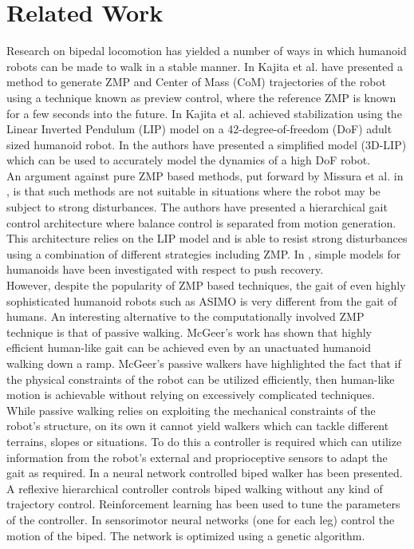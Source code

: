 \documentclass[12pt,twoside]{article}
\theoremstyle{plain}
\theoremstyle{definition}
\theoremstyle{remark}
\newcommand{\forceindent}{\leavevmode{\parindent=2em\indent}}
\begin{document}
\section{Related Work}
\label{sec:Related_Work}
Research on bipedal locomotion has yielded a number of  ways in which humanoid robots can be made to walk in a stable manner. In \cite{kajita2003biped} Kajita et al. have presented a method to generate ZMP and Center of Mass (CoM) trajectories of the robot using a technique known as preview control, where the reference ZMP is known for a few seconds into the future. In \cite{kajita2010biped} Kajita et al. achieved stabilization using the Linear Inverted Pendulum (LIP) model on a 42-degree-of-freedom (DoF) adult sized humanoid robot. In \cite{kajita20013d} the authors have presented a simplified model (3D-LIP) which can be used to accurately model the dynamics of a high DoF robot.\\
\forceindent An argument against pure ZMP based methods, put forward by Missura et al. in \cite{missura2013omnidirectional, missura2014online, missura2015gradient}, is that such methods are not suitable in situations where the robot may be subject to strong disturbances. The authors have presented a hierarchical gait control architecture where balance control is separated from motion generation. This architecture relies on the LIP model and is able to resist strong disturbances using a combination of different strategies including ZMP. In \cite{stephens2007humanoid}, simple models for humanoids have been investigated with respect to push recovery.\\
\forceindent However, despite the popularity of ZMP based techniques, the gait of even highly sophisticated humanoid robots such as ASIMO is very different from the gait of humans. An interesting alternative to the computationally involved ZMP technique is that of passive walking. McGeer's work \cite{mcgeer1990passive} has shown that highly efficient human-like gait can be achieved even by an unactuated humanoid walking down a ramp. McGeer's passive walkers have highlighted the fact that if the physical constraints of the robot can be utilized efficiently, then human-like motion is achievable without relying on excessively complicated techniques.\\
\forceindent While passive walking relies on exploiting the mechanical constraints of the robot's structure, on its own it cannot yield walkers which can tackle different terrains, slopes or situations. To do this a controller is required which can utilize information from the robot's external and proprioceptive sensors to adapt the gait as required. In \cite{geng2005fast} a neural network controlled biped walker has been presented. A reflexive hierarchical controller controls biped walking without any kind of trajectory control. Reinforcement learning has been used to tune the parameters of the controller. In \cite{paul2005sensorimotor} sensorimotor neural networks (one for each leg) control the motion of the biped. The network is optimized using a genetic algorithm.\\
\end{document}

